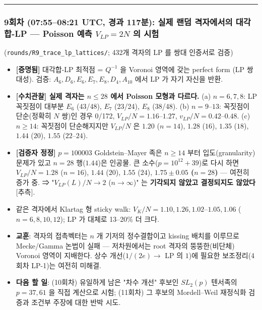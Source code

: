 \begin{center}\rule{0.5\linewidth}{0.5pt}\end{center}

\hypertarget{uxd68cuxcc28-07550821-utc-uxacbduxacfc-117uxbd84-uxc2e4uxc81c-uxb79cuxb364-uxaca9uxc790uxc5d0uxc11cuxc758-uxb300uxac01uxd569-lp-poisson-uxc608uxce21-v_lp2n-uxc758-uxc2dcuxd5d8}{%
\subsubsection*{\texorpdfstring{9회차 (07:55--08:21 UTC, 경과 117분): 실제 랜덤 격자에서의 대각합-LP --- Poisson 예측 \(V_{LP}=2N\) 의 시험}{9회차 (07:55--08:21 UTC, 경과 117분): 실제 랜덤 격자에서의 대각합-LP --- Poisson 예측 V\_\{LP\}=2N 의 시험}}\label{uxd68cuxcc28-07550821-utc-uxacbduxacfc-117uxbd84-uxc2e4uxc81c-uxb79cuxb364-uxaca9uxc790uxc5d0uxc11cuxc758-uxb300uxac01uxd569-lp-poisson-uxc608uxce21-v_lp2n-uxc758-uxc2dcuxd5d8}}

(\texttt{rounds/R9\_trace\_lp\_lattices/}; 432개 격자의 LP 를 쌍대 인증서로 검증)

\begin{itemize}
\tightlist
\item
  \textbf{{[}증명됨{]}} 대각합-LP 최적점 = \(Q^{-1}\) 을 Voronoi 영역에 갖는 perfect form (LP 쌍대성). 검증: \(A_6,D_6,E_6,E_7,E_8,D_4,A_{10}\) 에서 LP 가 자기 자신을 반환.
\item
  \textbf{{[}수치관찰{]} 실제 격자는 \(n\le28\) 에서 Poisson 모형과 다르다.} (a) \(n=6,7,8\): LP 꼭짓점이 대부분 \(E_6\) (43/48), \(E_7\) (23/24), \(E_8\) (38/48). (b) \(n=9\)--\(13\): 꼭짓점이 단순(정확히 \(N\) 쌍)인 경우 0/172, \(V_{LP}/N=1.16\)--\(1.27\), \(v_{LP}/N=0.42\)--\(0.48\). (c) \(n\ge14\): 꼭짓점이 단순해지지만 \(V_{LP}/N\) 은 \(1.20\) (\(n=14\)), \(1.28\) (\(16\)), \(1.35\) (\(18\)), \(1.44\) (\(20\)), \(1.55\) (\(22\)--\(24\)).
\item
  \textbf{{[}검증자 정정{]}} \(p=100003\) Goldstein--Mayer 족은 \(n\ge14\) 부터 입도(granularity) 문제가 있고 \(n=28\) 행(\(1.44\))은 인공물. 큰 소수(\(p=10^{12}+39\))로 다시 하면 \(V_{LP}/N=1.28\) (\(n=16\)), \(1.44\) (\(20\)), \(1.55\) (\(24\)), \textbf{\(1.75\pm0.05\) (\(n=28\))} --- 여전히 증가 중. ⇒ "\(V_{LP}(L)/N\to2\) (\(n\to\infty\))" 는 \textbf{기각되지 않았고 결정되지도 않았다} {[}추측{]}.
\item
  같은 격자에서 Klartag 형 sticky walk: \(V_K/N=1.10,1.26,1.02\)--\(1.05,1.06\) (\(n=6,8,10,12\)); LP 가 대체로 13--20\% 더 크다.
\item
  \textbf{교훈}: 격자의 접촉벡터는 \(n\) 개 기저의 정수결합이고 kissing 배치를 이루므로 Mecke/Gamma 논법이 실패 --- 저차원에서는 root 격자의 뚱뚱한(비단체) Voronoi 영역이 지배한다. 상수 개선(\(1/(2e)\to\) LP 의 \(1\))에 필요한 보조정리(4회차 LP-1)는 여전히 미해결.
\item
  \textbf{다음 할 일}: (10회차) 유일하게 남은 "차수 개선" 후보인 \(SL_2(p)\) 텐서족의 \(p=37,61\) 을 직접 계산으로 시험; (11회차) 그 후보의 Mordell--Weil 재정식화 검증과 조건부 주장에 대한 반박 시도.
\end{itemize}

